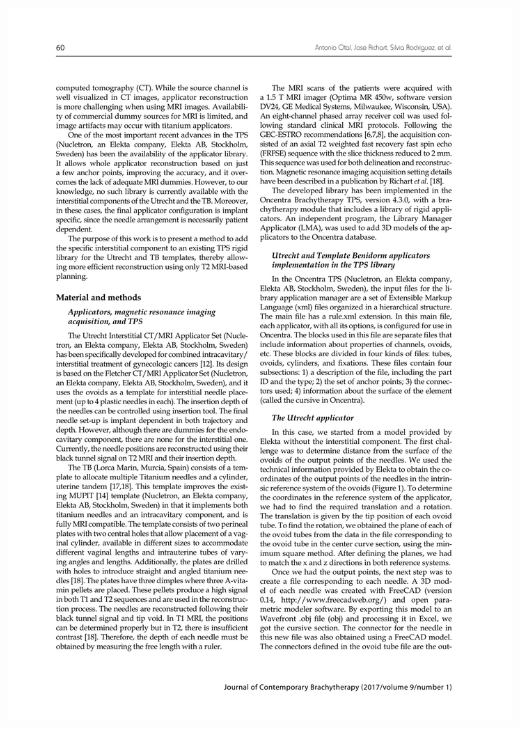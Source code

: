 \documentclass[
  a4paper,
]{scrreprt}
\begin{document}
\includegraphics{articulos/librerias/librerias-2.png}
\end{document}
